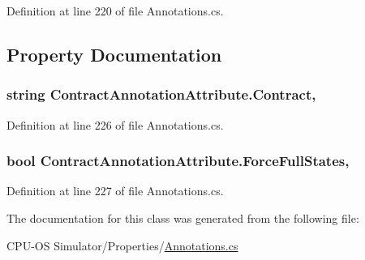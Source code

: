Definition at line 220 of file Annotations.\+cs.



\subsection{Property Documentation}
\hypertarget{class_contract_annotation_attribute_a19445968a4365371890d047311eaa1c4}{}
\subsubsection[{Contract}]{\setlength{\rightskip}{0pt plus 5cm}string Contract\+Annotation\+Attribute.\+Contract\hspace{0.3cm}{\ttfamily [get]}, {}}\label{class_contract_annotation_attribute_a19445968a4365371890d047311eaa1c4}


Definition at line 226 of file Annotations.\+cs.

\hypertarget{class_contract_annotation_attribute_a329c6f99fe2ed0c08df3898586cbf965}{}
\subsubsection[{Force\+Full\+States}]{\setlength{\rightskip}{0pt plus 5cm}bool Contract\+Annotation\+Attribute.\+Force\+Full\+States\hspace{0.3cm}{\ttfamily [get]}, {}}\label{class_contract_annotation_attribute_a329c6f99fe2ed0c08df3898586cbf965}


Definition at line 227 of file Annotations.\+cs.



The documentation for this class was generated from the following file\+:\begin{DoxyCompactItemize}
\item 
C\+P\+U-\/\+O\+S Simulator/\+Properties/\hyperlink{_annotations_8cs}{Annotations.\+cs}\end{DoxyCompactItemize}
